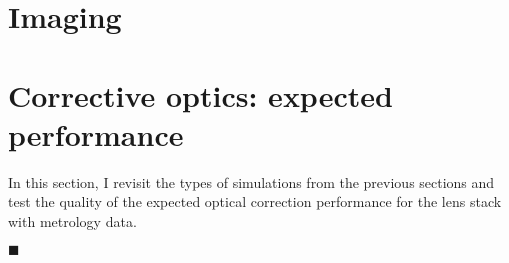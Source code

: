 \begin{refsection}
\section{Imaging}


\section{Corrective optics: expected performance}
In this section, I revisit the types of simulations from the previous sections and test the quality of the expected optical correction performance for the lens stack with metrology data.

$\blacksquare$
\printbibliography[heading=subbibliography]
\end{refsection}
